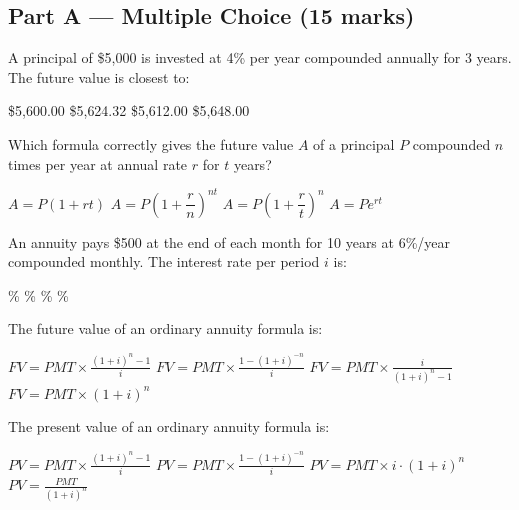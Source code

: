 \documentclass[addpoints]{exam}
\begin{document}
\newpage
\begin{questions}

\section*{Part A --- Multiple Choice (15 marks)}
\vspace{5mm}

\question[1]
A principal of \$5{,}000 is invested at 4\% per year compounded annually for 3 years. The future value is closest to:
\begin{choices}
    \choice \$5{,}600.00
    \correctchoice \$5{,}624.32
    \choice \$5{,}612.00
    \choice \$5{,}648.00
\end{choices}
\vspace{3mm}

\question[1]
Which formula correctly gives the future value $A$ of a principal $P$ compounded $n$ times per year at annual rate $r$ for $t$ years?
\begin{choices}
    \choice $A = P(1 + rt)$
    \correctchoice $A = P\!\left(1 + \dfrac{r}{n}\right)^{nt}$
    \choice $A = P\!\left(1 + \dfrac{r}{t}\right)^{n}$
    \choice $A = P e^{rt}$
\end{choices}
\vspace{3mm}

\question[1]
An annuity pays \$500 at the end of each month for 10 years at 6\%/year compounded monthly. The interest rate per period $i$ is:
\begin{choices}
    \%
    \%
    \%
    \%
\end{choices}
\vspace{3mm}

\question[1]
The future value of an ordinary annuity formula is:
\begin{choices}
    \correctchoice $\displaystyle FV = PMT \times \frac{(1+i)^n - 1}{i}$
    \choice $\displaystyle FV = PMT \times \frac{1-(1+i)^{-n}}{i}$
    \choice $\displaystyle FV = PMT \times \frac{i}{(1+i)^n - 1}$
    \choice $\displaystyle FV = PMT \times (1+i)^n$
\end{choices}
\vspace{3mm}

\question[1]
The present value of an ordinary annuity formula is:
\begin{choices}
    \choice $\displaystyle PV = PMT \times \frac{(1+i)^n - 1}{i}$
    \correctchoice $\displaystyle PV = PMT \times \frac{1-(1+i)^{-n}}{i}$
    \choice $\displaystyle PV = PMT \times i \cdot (1+i)^n$
    \choice $\displaystyle PV = \frac{PMT}{(1+i)^n}$
\end{choices}
\vspace{3mm}


\end{questions}
\end{document}
